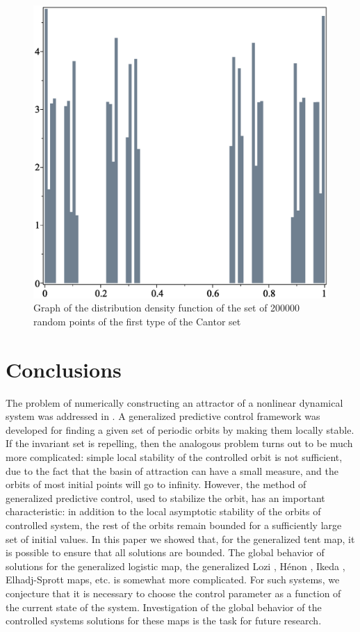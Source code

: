 \documentclass[12pt,a4paper]{amsart}
\begin{document}
\begin{figure}[h!]
\centering
\includegraphics[scale=0.28]{Fig16}
\caption{Graph of the distribution density function of the set of 200000 random points of the first type of the Cantor set} \label{f16}
\end{figure}

\section{Conclusions} \label{sec:Conclusions}

The problem of numerically constructing an attractor of a nonlinear dynamical system was addressed in \cite{DSI}.  A generalized predictive control framework was developed for finding a given set of periodic orbits by making them locally stable.
 If the invariant set is repelling, then the analogous problem turns out to be much more complicated: simple local stability 
of the controlled orbit is not sufficient, due to the fact that the basin of attraction can have a small measure, and the orbits of most  initial points will go to infinity. 
However, the method of generalized predictive control, used to stabilize the orbit, has an important characteristic: in addition to the local asymptotic stability 
of the orbits of controlled system, the rest of the orbits remain bounded for a sufficiently large set of initial values. In this paper we showed that, for the generalized tent map, it is possible to ensure 
that all solutions are bounded. The global behavior of solutions for the generalized logistic map, the generalized Lozi \cite{Lozi1}, Hénon \cite{Henon}, Ikeda \cite{Ikeda}, Elhadj-Sprott \cite{El-Spr} maps, etc. is somewhat more complicated. 
For such systems, we conjecture that it is necessary to choose the control parameter as a function of the current state of the system. 
Investigation of the global behavior of 
the controlled systems solutions for these maps is the task for future research.
\end{document}
